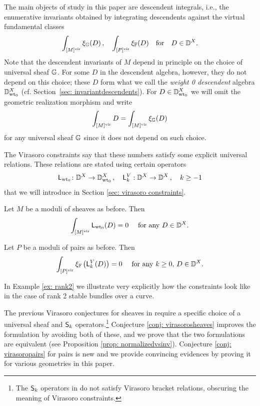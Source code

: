 \documentclass[a4paper, 12pt]{amsart}
\begin{document}
The main objects of study in this paper are descendent integrals, i.e., the enumerative invariants obtained by integrating descendents against the virtual fundamental classes
\[\int_{[M]^{\mathrm{vir}}}\xi_{{\mathbb{G}}}(D)\,,\quad \int_{[P]^{\mathrm{vir}}}\xi_{{\mathbb{F}}}(D)\quad \textnormal{for}\quad D\in {\mathbb{D}}^X.\]
Note that the descendent invariants of $M$ depend in principle on the choice of universal sheaf ${\mathbb{G}}$. For some $D$ in the descendent algebra, however, they do not depend on this choice; these $D$ form what we call the  \textit{weight 0 descendent} algebra ${\mathbb{D}}^X_{{\mathrm{wt}_0}}$ (cf. Section~\ref{sec: invariantdescendents}). For $D\in {\mathbb{D}}^X_{{\mathrm{wt}_0}}$ we will omit the geometric realization morphism and write
\[\int_{[M]^{\mathrm{vir}}}D=\int_{[M]^{\mathrm{vir}}}\xi_{\mathbb{G}}(D)\]
for any universal sheaf ${\mathbb{G}}$ since it does not depend on such choice.

The Virasoro constraints say that these numbers satisfy some explicit universal relations. These relations are stated using certain operators
\[{\mathsf{L}}_{{\mathrm{wt}_0}}\colon {\mathbb{D}}^X\to {\mathbb{D}}^X_{{\mathrm{wt}_0}}\,,\quad {\mathsf{L}}_k^V:{\mathbb{D}}^X\to {\mathbb{D}}^X\,,\quad k\geq -1\]
that we will introduce in Section \ref{sec: virasoro constraints}. 
\begin{conjecture}\label{conj: virasorosheaves}
Let $M$ be a moduli of sheaves as before. Then
\[\int_{[M]^{\mathrm{vir}}} \mathsf{L}_{{\mathrm{wt}_0}}(D)=0\quad \textup{ for any }D\in {\mathbb{D}}^X.\]
\end{conjecture}

\begin{conjecture}
\label{conj: virasoropairs}
Let $P$ be a moduli of pairs as before. Then
\[\int_{[P]^{\mathrm{vir}}} \xi_{\mathbb{F}}\left({\mathsf{L}}_k^V(D)\right)=0\quad \textup{ for any }k\geq 0, \, D\in {\mathbb{D}}^X.\]
\end{conjecture}

In Example \ref{ex: rank2} we illustrate very explicitly how the constraints look like in the case of rank 2 stable bundles over a curve. 

\begin{remark}
The previous Virasoro conjectures for sheaves in \cite{moop, moreira, bree} require a specific choice of a universal sheaf and ${\mathsf{S}}_k$ operators.\footnote{The ${\mathsf{S}}_k$ operators in \cite{moop, moreira, bree} do not satisfy Virasoro bracket relations, obscuring the meaning of Virasoro constraints.} Conjecture \ref{conj: virasorosheaves} improves the formulation by avoiding both of these, and  we prove that the two formulations are equivalent (see Proposition \ref{prop: normalizedvsinv}). Conjecture \ref{conj: virasoropairs} for pairs is new and we provide convincing evidences by proving it for various geometries in this paper. 
\end{remark}
\end{document}
